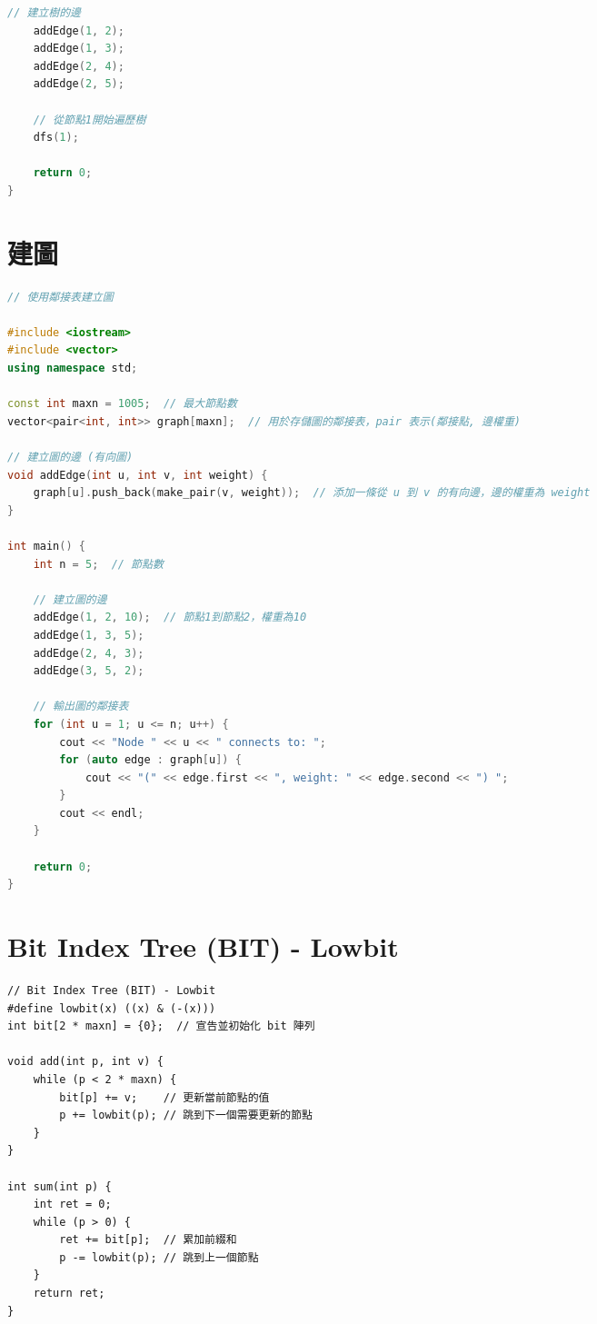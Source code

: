\documentclass{article}
\begin{document}
\begin{multicols}{2}
\begin{lstlisting}[language=C++]
    // 建立樹的邊
    addEdge(1, 2);
    addEdge(1, 3);
    addEdge(2, 4);
    addEdge(2, 5);

    // 從節點1開始遍歷樹
    dfs(1);

    return 0;
}
\end{lstlisting}

\section{建圖}

\begin{lstlisting}[language=C++]
// 使用鄰接表建立圖

#include <iostream>
#include <vector>
using namespace std;

const int maxn = 1005;  // 最大節點數
vector<pair<int, int>> graph[maxn];  // 用於存儲圖的鄰接表，pair 表示(鄰接點, 邊權重)

// 建立圖的邊 (有向圖)
void addEdge(int u, int v, int weight) {
    graph[u].push_back(make_pair(v, weight));  // 添加一條從 u 到 v 的有向邊，邊的權重為 weight
}

int main() {
    int n = 5;  // 節點數

    // 建立圖的邊
    addEdge(1, 2, 10);  // 節點1到節點2，權重為10
    addEdge(1, 3, 5);
    addEdge(2, 4, 3);
    addEdge(3, 5, 2);

    // 輸出圖的鄰接表
    for (int u = 1; u <= n; u++) {
        cout << "Node " << u << " connects to: ";
        for (auto edge : graph[u]) {
            cout << "(" << edge.first << ", weight: " << edge.second << ") ";
        }
        cout << endl;
    }

    return 0;
}
\end{lstlisting}


\section{Bit Index Tree (BIT) - Lowbit}

\begin{lstlisting}
// Bit Index Tree (BIT) - Lowbit
#define lowbit(x) ((x) & (-(x)))
int bit[2 * maxn] = {0};  // 宣告並初始化 bit 陣列

void add(int p, int v) {
    while (p < 2 * maxn) {
        bit[p] += v;    // 更新當前節點的值
        p += lowbit(p); // 跳到下一個需要更新的節點
    }
}

int sum(int p) {
    int ret = 0;
    while (p > 0) {
        ret += bit[p];  // 累加前綴和
        p -= lowbit(p); // 跳到上一個節點
    }
    return ret;
}
\end{lstlisting}


\end{multicols}
\end{document}
